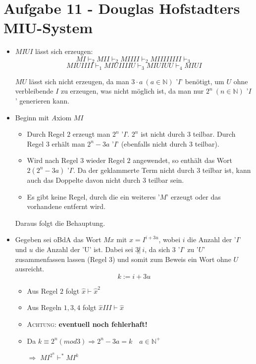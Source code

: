 \section*{Aufgabe 11 - Douglas Hofstadters MIU-System}
\begin{itemize}
  \item $MIUI$ lässt sich erzeugen:
  \[ MI \vdash_{2} MII \vdash_{2} MIIII \vdash_{2} MIIIIIIII \vdash_{3} \]
  \[ MIUIIII \vdash_{1} MIUIIIIU \vdash_{3} MIUIUU \vdash_{4} MIUI \]
  
  $MU$ lässt sich nicht erzeugen, da man $3\cdot a\ (a \in \mathds{N})$ '$I$'
  benötigt, um $U$ ohne verbleibende $I$ zu erzeugen, was nicht möglich ist, da
  man nur $2^{n}\ (n \in \mathds{N})$ '$I$' generieren kann.

  \item Beginn mit {\textit Axiom} $MI$
    \begin{itemize}
      \item Durch Regel $2$ erzeugt man $2^{n}$ '$I$'. $2^{n}$ ist nicht durch
      $3$ teilbar. Durch Regel $3$ erhält man $2^{n} - 3a$ '$I$' (ebenfalls
      nicht durch $3$ teilbar).
      \item Wird nach Regel $3$ wieder Regel $2$ angewendet, so enthält das
      Wort $2(2^{n} - 3a)$ '$I$'. Da der geklammerte Term nicht durch $3$
      teilbar ist, kann auch das Doppelte davon nicht durch $3$ teilbar sein.
      \item Es gibt keine Regel, durch die ein weiteres '$M$' erzeugt oder das
      vorhandene entfernt wird.
    \end{itemize}
    Daraus folgt die Behauptung.

  \item Gegeben sei oBdA das Wort $Mx$ mit $x=I^{i+3u}$, wobei $i$ die Anzahl
  der '$I$' und $u$ die Anzahl der 'U' ist. Dabei sei $3\not|\ i$, da sich $3$
  '$I$' zu '$U$' zusammenfassen lassen (Regel $3$) und somit zum Beweis ein
  Wort ohne $U$ ausreicht.
  \[ k := i + 3u \]
  \begin{itemize}
    \item Aus Regel $2$ folgt $\hat x \vdash \hat x^{2}$
    \item Aus Regeln $1, 3, 4$ folgt $\hat xIII \vdash \hat x$
    \item \textsc{Achtung:} \textbf{eventuell noch fehlerhaft!}
    \item Da $k \equiv 2^{n} (mod 3) \Rightarrow 2^{n} - 3a 
                = k\quad a \in \mathds{N}^{+}$
    \item[$\Rightarrow$] $MI^{2^{n}} \vdash^{*} MI^{k}$
  \end{itemize}


\end{itemize}
